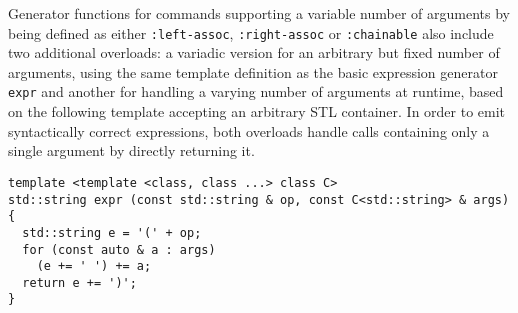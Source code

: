 \noindent
Generator functions for \SMTLIB commands supporting a variable number of arguments by being defined as either \lstinline[language=SMTLib]{:left-assoc}, \lstinline[language=SMTLib]{:right-assoc} or \lstinline[language=SMTLib]{:chainable} %
also include two additional overloads:
a variadic version for an arbitrary but fixed number of arguments, using the same template definition as the basic expression generator \lstinline[style=c++]{expr}
and another for handling a varying number of arguments at runtime, based on the following template accepting an arbitrary STL container.
In order to emit syntactically correct \SMTLIB expressions, both overloads handle calls containing only a single argument by directly returning it.



\newpage

\begin{lstlisting}[style=c++]
template <template <class, class ...> class C>
std::string expr (const std::string & op, const C<std::string> & args)
{
  std::string e = '(' + op;
  for (const auto & a : args)
    (e += ' ') += a;
  return e += ')';
}
\end{lstlisting}

